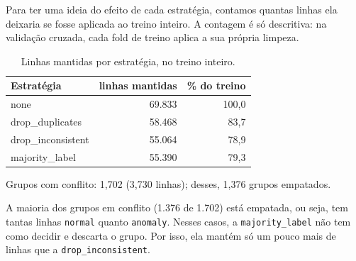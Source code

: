 \documentclass[11pt,a4paper]{article}
\begin{document}
Para ter uma ideia do efeito de cada estratégia, contamos quantas linhas ela deixaria se fosse aplicada ao treino inteiro. A contagem é só descritiva: na validação cruzada, cada fold de treino aplica a sua própria limpeza.

\begin{table}[H]
\centering
\caption{Linhas mantidas por estratégia, no treino inteiro.}
\begin{tabular}{lrr}
\toprule
Estratégia & linhas mantidas & \% do treino \\
\midrule
none & 69.833 & 100,0 \\
drop\_duplicates & 58.468 & 83,7 \\
drop\_inconsistent & 55.064 & 78,9 \\
majority\_label & 55.390 & 79,3 \\
\bottomrule
\end{tabular}
\end{table}

\begin{saida}
Grupos com conflito: 1,702 (3,730 linhas); desses, 1,376 grupos empatados.
\end{saida}

A maioria dos grupos em conflito (1.376 de 1.702) está empatada, ou seja, tem tantas linhas \texttt{normal} quanto \texttt{anomaly}. Nesses casos, a \texttt{majority\_label} não tem como decidir e descarta o grupo. Por isso, ela mantém só um pouco mais de linhas que a \texttt{drop\_inconsistent}.
\end{document}
